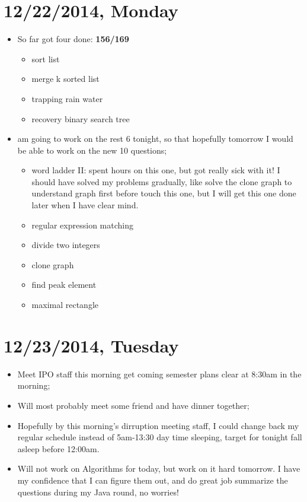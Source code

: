 \documentclass[9pt,b5paper]{article}
\begin{document}
\section{12/22/2014, Monday}
\label{sec-3}
\begin{itemize}
\item So far got four done: \textbf{156/169}
\begin{itemize}
\item sort list
\item merge k sorted list
\item trapping rain water
\item recovery binary search tree
\end{itemize}
\item am going to work on the rest 6 tonight, so that hopefully tomorrow I would be able to work on the new 10 questions;
\begin{itemize}
\item word ladder II: spent hours on this one, but got really sick with it! I should have solved my problems gradually, like solve the clone graph to understand graph first before touch this one, but I will get this one done later when I have clear mind.
\item regular expression matching
\item divide two integers
\item clone graph
\item find peak element
\item maximal rectangle
\end{itemize}
\end{itemize}
\section{12/23/2014, Tuesday}
\label{sec-4}
\begin{itemize}
\item Meet IPO staff this morning get coming semester plans clear at 8:30am in the morning;
\item Will most probably meet some friend and have dinner together;
\item Hopefully by this morning's dirruption meeting staff, I could change back my regular schedule instead of 5am-13:30 day time sleeping, target for tonight fall asleep before 12:00am.
\item Will not work on Algorithms for today, but work on it hard tomorrow. I have my confidence that I can figure them out, and do great job summarize the questions during my Java round, no worries!
\end{itemize}
\end{document}
